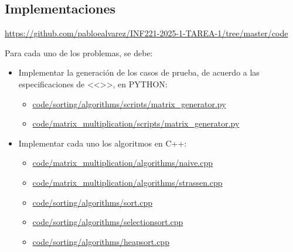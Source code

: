 
\subsection{Implementaciones}

\begin{mdframed}

    \begin{center}
    
    \url{https://github.com/pabloealvarez/INF221-2025-1-TAREA-1/tree/master/code}
        
\end{center}
\end{mdframed}

Para cada uno de los problemas, se debe:
\begin{itemize}
    \item Implementar la generación de los casos de prueba, de acuerdo a las especificaciones de <<>>, en PYTHON: 
    \begin{itemize}
        \item \href{https://github.com/pabloealvarez/INF221-2025-1-TAREA-1/blob/master/code/sorting/scripts/array_generator.py}{code/sorting/algorithms/scripts/matrix\_generator.py}
        \item \href{https://github.com/pabloealvarez/INF221-2025-1-TAREA-1/blob/master/code/matrix_multiplication/scripts/matrix_generator.py}{code/matrix\_multiplication/scripts/matrix\_generator.py}
    \end{itemize}
    \item Implementar cada uno los algoritmos en C++:
    \begin{itemize}
        \item \href{https://github.com/pabloealvarez/INF221-2025-1-TAREA-1/blob/master/code/matrix_multiplication/algorithms/naive.cpp}{code/matrix\_multiplication/algorithms/naive.cpp}
        \item \href{https://github.com/pabloealvarez/INF221-2025-1-TAREA-1/blob/master/code/matrix_multiplication/algorithms/strassen.cpp}{code/matrix\_multiplication/algorithms/strassen.cpp}
        \item \href{https://github.com/pabloealvarez/INF221-2025-1-TAREA-1/blob/master/code/sorting/algorithms/sort.cpp}{code/sorting/algorithms/sort.cpp}
        \item \href{https://github.com/pabloealvarez/INF221-2025-1-TAREA-1/blob/master/code/sorting/algorithms/selectionsort.cpp}{code/sorting/algorithms/selectionsort.cpp}
        \item \href{https://github.com/pabloealvarez/INF221-2025-1-TAREA-1/blob/master/code/sorting/algorithms/heapsort.cpp}{code/sorting/algorithms/heapsort.cpp}

\end{itemize}
\end{itemize}
